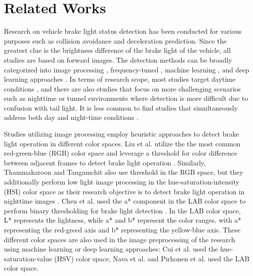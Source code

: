 \section{Related Works}
\label{sec:related}

Research on vehicle brake light status detection has been conducted for various purposes such as collision avoidance and deceleration prediction.
Since the greatest clue is the brightness difference of the brake light of the vehicle, all studies are based on forward images.
The detection methods can be broadly categorized into image processing \cite{thammakaroon2009predictive, chen2015daytime, liu2015vision}, frequency-tuned \cite{chen2012frequency}, machine learning \cite{cui2015vision, nava2019collision, pirhonen2022brake}, and deep learning approaches \cite{wang2016appearance, li2020highly, kim2022detecting}.
In terms of research scope, most studies target daytime conditions \cite{liu2015vision,chen2015daytime,cui2015vision,wang2016appearance,nava2019collision,pirhonen2022brake}, and there are also studies that focus on more challenging scenarios such as nighttime \cite{thammakaroon2009predictive,chen2012frequency} or tunnel environments \cite{kim2022detecting} where detection is more difficult due to confusion with tail light.
It is less common to find studies that simultaneously address both day and night-time conditions \cite{li2020highly}.

Studies utilizing image processing employ heuristic approaches to detect brake light operation in different color spaces.
Liu et al. utilize the the most common red-green-blue (RGB) color space and leverage a threshold for color difference between adjacent frames to detect brake light operation \cite{liu2015vision}.
Similarly, Thammakaroon and Tangamchit also use threshold in the RGB space, but they additionally perform low light image processing in the hue-saturation-intensity (HSI) color space as their research objective is to detect brake light operation in nighttime images \cite{thammakaroon2009predictive}.
Chen et al. used the a* component in the LAB color space to perform binary thresholding for brake light detection \cite{chen2015daytime}.
In the LAB color space, L* represents the lightness, while a* and b* represent the color ranges, with a* representing the red-greed axis and b* representing the yellow-blue axis.
These different color spaces are also used in the image preprocessing of the research using machine learning or deep learning approaches: Cui et al. \cite{cui2015vision} used the hue-saturation-value (HSV) color space, Nava et al. \cite{nava2019collision} and Pirhonen et al. \cite{pirhonen2022brake} used the LAB color space.

